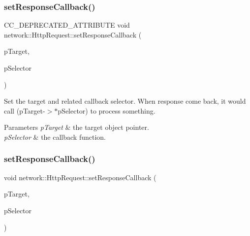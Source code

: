 \subsubsection{\texorpdfstring{set\+Response\+Callback()}{setResponseCallback()}\hspace{0.1cm}{\footnotesize\ttfamily [2/6]}}
{\footnotesize\ttfamily C\+C\+\_\+\+D\+E\+P\+R\+E\+C\+A\+T\+E\+D\+\_\+\+A\+T\+T\+R\+I\+B\+U\+TE void network\+::\+Http\+Request\+::set\+Response\+Callback (\begin{DoxyParamCaption}\item[{\hyperlink{classRef}{Ref} $\ast$}]{p\+Target,  }\item[{S\+E\+L\+\_\+\+Call\+Func\+ND}]{p\+Selector }\end{DoxyParamCaption})\hspace{0.3cm}{\ttfamily [inline]}}

Set the target and related callback selector. When response come back, it would call (p\+Target-\/$>$$\ast$p\+Selector) to process something.


\begin{DoxyParams}{Parameters}
{\em p\+Target} & the target object pointer. \\
\hline
{\em p\+Selector} & the callback function. \\
\hline
\end{DoxyParams}
\mbox{\label{classnetwork_1_1HttpRequest_a58c485555dd39dfdcbc641cfb6d3fb9a}} 
\subsubsection{\texorpdfstring{set\+Response\+Callback()}{setResponseCallback()}\hspace{0.1cm}{\footnotesize\ttfamily [3/6]}}
{\footnotesize\ttfamily void network\+::\+Http\+Request\+::set\+Response\+Callback (\begin{DoxyParamCaption}\item[{\hyperlink{classRef}{Ref} $\ast$}]{p\+Target,  }\item[{S\+E\+L\+\_\+\+Http\+Response}]{p\+Selector }\end{DoxyParamCaption})\hspace{0.3cm}{\ttfamily [inline]}}

